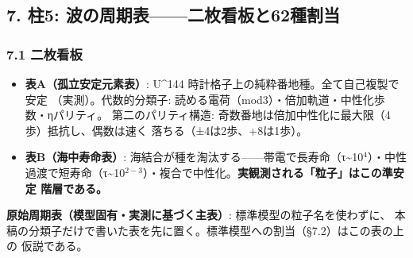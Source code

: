 \documentclass[
]{ltjarticle}
\providecommand{\tightlist}{%
  \setlength{\itemsep}{0pt}\setlength{\parskip}{0pt}}
\begin{document}
\subsection{7. 柱5:
波の周期表------二枚看板と62種割当}\label{ux67f15-ux6ce2ux306eux5468ux671fux8868ux4e8cux679aux770bux677fux306862ux7a2eux5272ux5f53}

\subsubsection{7.1 二枚看板}\label{ux4e8cux679aux770bux677f}

\begin{itemize}
\tightlist
\item
  \textbf{表A（孤立安定元素表）}: U\^{}144
  時計格子上の純粋番地種。全て自己複製で安定 （実測）。代数的分類子:
  読める電荷（mod3）・倍加軌道・中性化歩数・ηパリティ。
  第二のパリティ構造:
  奇数番地は倍加中性化に最大限（4歩）抵抗し、偶数は速く
  落ちる（±4は2歩、+8は1歩）。
\item
  \textbf{表B（海中寿命表）}:
  海結合が種を淘汰する------帯電で長寿命（τ\textasciitilde10\(^{4}\)）・中性
  過渡で短寿命（τ\textasciitilde10\(^{2-3}\)）・複合で中性化。\textbf{実観測される「粒子」はこの準安定
  階層である。}
\end{itemize}

\textbf{原始周期表（模型固有・実測に基づく主表）}:
標準模型の粒子名を使わずに、
本稿の分類子だけで書いた表を先に置く。標準模型への割当（§7.2）はこの表の上の
仮説である。
\end{document}
